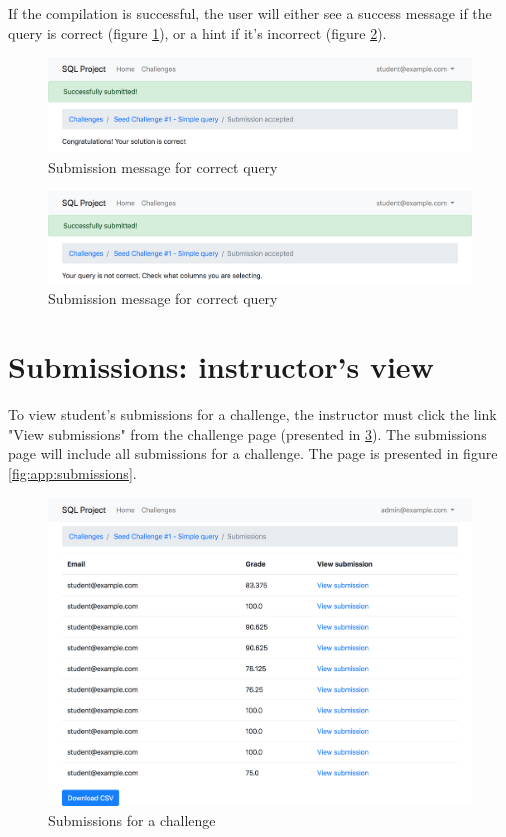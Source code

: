 If the compilation is successful, the user will either see a success message if the query is correct (figure \ref{fig:app:submit_correct}), or a hint if it's incorrect (figure \ref{fig:app:submit_incorrect}).

\begin{figure}[H]
    \centering
    \includegraphics[width=\textwidth/4*3]{Appendices/submit_correct.png}
    \caption{Submission message for correct query}
    \label{fig:app:submit_correct}
\end{figure}

\begin{figure}[H]
    \centering
    \includegraphics[width=\textwidth/4*3]{Appendices/submit_hint.png}
    \caption{Submission message for correct query}
    \label{fig:app:submit_incorrect}
\end{figure}

\section{Submissions: instructor's view}

To view student's submissions for a challenge, the instructor must click the link "View submissions" from the challenge page (presented in \ref{fig:app:challengeadmin}). The submissions page will include all submissions for a challenge. The page is presented in figure \ref{fig:app:submissions}.

\begin{figure}[ht]
    \centering
    \includegraphics[width=\textwidth/4*3]{Appendices/submissions.png}
    \caption{Submissions for a challenge}
    \label{fig:app:challengeadmin}
\end{figure}

